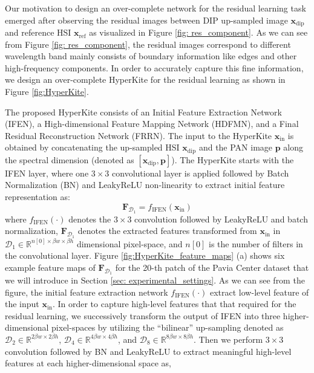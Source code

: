 \documentclass[journal]{IEEEtran}
\begin{document}
    \par Our motivation to design an over-complete network for the residual learning task emerged after observing the residual images between DIP up-sampled image $\mathbf{x}_{\text{dip}}$ and reference HSI $\mathbf{x}_{\text{ref}}$ as  visualized in Figure \ref{fig: res_component}. As we can see from Figure \ref{fig: res_component}, the residual images correspond to different wavelength band mainly consists of boundary information like edges and other high-frequency components. In order to accurately capture this fine information, we design an over-complete HyperKite for the residual learning as shown in Figure \ref{fig:HyperKite}.
    
    The proposed HyperKite consists of an Initial Feature Extraction Network (IFEN), a High-dimensional Feature Mapping Network (HDFMN), and a Final Residual Reconstruction Network (FRRN). The input to the HyperKite $\mathbf{x}_{\text{in}}$ is obtained by concatenating the up-sampled HSI $\mathbf{x}_{\text{dip}}$ and the PAN image $\mathbf{p}$ along the spectral dimension (denoted as $[\mathbf{x}_{\text{dip}}, \mathbf{p}]$). The HyperKite starts with the IFEN layer, where one $3 \times 3$ convolutional layer is applied followed by Batch Normalization (BN) and LeakyReLU non-linearity to extract initial feature representation as:
    \begin{equation}
        \mathbf{F}_{\mathcal{D}_1} = f_{\text{IFEN}}(\mathbf{x}_{\text{in}})
    \end{equation}
    where $f_{\text{IFEN}}(\cdot)$ denotes the $3\times3$ convolution followed by LeakyReLU and batch normalization, $\mathbf{F}_{\mathcal{D}_1}$ denotes the extracted features transformed from $\mathbf{x}_{\text{in}}$ in $\mathcal{D}_1 \in \mathbb{R}^{n[0] \times \beta w \times \beta h}$ dimensional pixel-space, and $n[0]$ is the number of filters in the convolutional layer. Figure \ref{fig:HyperKite_feature_maps} (a) shows six example feature maps of $\mathbf{F}_{\mathcal{D}_1}$ for the 20-th patch of the Pavia Center dataset that we will introduce in Section \ref{sec: experimental_settings}. As we can see from the figure, the initial feature extraction network $f_{\text{IFEN}}(\cdot)$ extract low-level feature of the input $\mathbf{x}_{\text{in}}$. In order to capture high-level features that that required for the residual learning, we successively transform the output of IFEN into three higher-dimensional pixel-spaces by utilizing the ``bilinear'' up-sampling denoted as $\mathcal{D}_2 \in \mathbb{R}^{2\beta w \times 2\beta h}$, $\mathcal{D}_4\in \mathbb{R}^{4\beta w \times 4\beta h}$, and $\mathcal{D}_8 \in \mathbb{R}^{8\beta w \times 8\beta h}$. Then we perform $3 \times 3$ convolution followed by BN and LeakyReLU to extract meaningful high-level features at each higher-dimensional space as, 
\end{document}
